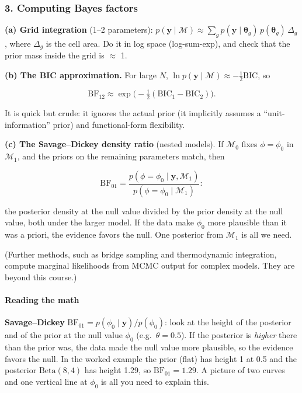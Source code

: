 \subsubsection{3. Computing Bayes factors}

\textbf{(a) Grid integration} (1--2 parameters):
\(p(\mathbf{y}\mid\mathcal{M}) \approx \sum_g p(\mathbf{y}\mid\boldsymbol\theta_g)\, p(\boldsymbol\theta_g)\, \Delta_g\),
where \(\Delta_g\) is the cell area. Do it in log space (log-sum-exp),
and check that the prior mass inside the grid is \ensuremath{\approx} 1.

\textbf{(b) The BIC approximation.} For large \(N\),
\(\ln p(\mathbf{y}\mid\mathcal{M}) \approx -\tfrac12\mathrm{BIC}\), so

\[
\mathrm{BF}_{12} \approx \exp\big(-\tfrac12(\mathrm{BIC}_1 - \mathrm{BIC}_2)\big).
\]

It is quick but crude: it ignores the actual prior (it implicitly
assumes a ``unit-information'' prior) and functional-form flexibility.

\textbf{(c) The Savage--Dickey density ratio} (nested models). If
\(\mathcal{M}_0\) fixes \(\phi = \phi_0\) in \(\mathcal{M}_1\), and the
priors on the remaining parameters match, then

\[
\mathrm{BF}_{01} = \frac{p(\phi = \phi_0 \mid \mathbf{y}, \mathcal{M}_1)}{p(\phi = \phi_0 \mid \mathcal{M}_1)}:
\]

the posterior density at the null value divided by the prior density at
the null value, both under the larger model. If the data make \(\phi_0\)
more plausible than it was a priori, the evidence favors the null. One
posterior from \(\mathcal{M}_1\) is all we need.

(Further methods, such as bridge sampling and thermodynamic integration,
compute marginal likelihoods from MCMC output for complex models. They
are beyond this course.)

\paragraph{Reading the math}

\textbf{Savage--Dickey}
\(\mathrm{BF}_{01} = p(\phi_0 \mid \mathbf{y}) / p(\phi_0)\): look at
the height of the posterior and of the prior at the null value
\(\phi_0\) (e.g.~\(\theta = 0.5\)). If the posterior is \emph{higher}
there than the prior was, the data made the null value more plausible,
so the evidence favors the null. In the worked example the prior (flat)
has height 1 at 0.5 and the posterior \(\mathrm{Beta}(8,4)\) has height
1.29, so \(\mathrm{BF}_{01} = 1.29\). A picture of two curves and one
vertical line at \(\phi_0\) is all you need to explain this.

